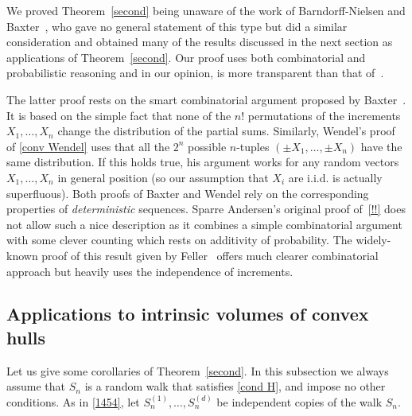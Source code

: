 \documentclass[12pt, reqno]{amsart}
\begin{document}
We proved Theorem~\ref{second} being unaware of the work of Barndorff-Nielsen and Baxter~\cite{Nielsen}, who gave no general statement of this type but did a similar consideration and obtained many of the results discussed in the next section as applications of Theorem~\ref{second}. Our proof uses both combinatorial and probabilistic reasoning and in our opinion, is more transparent than that of~\cite{Nielsen}.

The latter proof rests on the smart combinatorial argument proposed by Baxter~\cite{Baxter}. It is based on the simple fact that none of the $n!$ permutations of the increments $X_1, \dots, X_n$   change the distribution of the partial sums. Similarly, Wendel's proof of \eqref{conv Wendel} uses that all the $2^n$ possible $n$-tuples $(\pm X_1, \dots, \pm X_n)$ have the same distribution. If this holds true, his argument works for any random vectors $X_1, \dots, X_n$ in general position (so our assumption that $X_i$ are i.i.d. is actually superfluous). Both proofs of Baxter and Wendel rely on the corresponding properties of {\it deterministic} sequences. Sparre Andersen's original proof of~\eqref{!!} does not allow such a nice description as it combines a simple combinatorial argument with some clever counting which rests on additivity of probability. The widely-known proof of this result given by Feller~\cite[Sec. XII.6]{Feller} offers much clearer combinatorial approach but heavily uses the independence of increments.



\subsection{Applications to intrinsic volumes of convex hulls}\label{1324}
Let us give some corollaries of Theorem~\ref{second}. In this subsection we always assume that $S_n$ is a random walk that satisfies \eqref{cond H}, and impose no other conditions. As in \eqref{1454}, let $S^{(1)}_n, \dots, S^{(d)}_n$ be independent copies of the  walk $S_n$.
\end{document}
